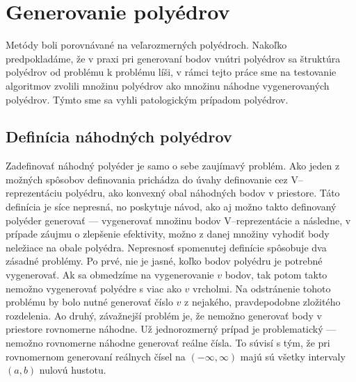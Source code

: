 \section{Generovanie polyédrov}
Metódy boli porovnávané na veľarozmerných polyédroch.
Nakoľko predpokladáme, že v praxi pri generovaní bodov vnútri polyédrov sa štruktúra polyédrov od problému k problému líši, v rámci tejto práce sme na testovanie algoritmov zvolili množinu polyédrov ako množinu náhodne vygenerovaných polyédrov.
Týmto sme sa vyhli patologickým prípadom polyédrov.

\subsection{Definícia náhodných polyédrov}
Zadefinovať náhodný polyéder je samo o sebe zaujímavý problém. Ako jeden z možných spôsobov definovania prichádza do úvahy definovanie cez V--reprezentáciu polyédru, ako konvexný obal náhodných bodov v priestore. Táto definícia je síce nepresná, no poskytuje návod, ako aj možno takto definovaný polyéder generovať --- vygenerovať množinu bodov V--reprezentácie a následne, v prípade záujmu o zlepšenie efektivity, možno z danej množiny vyhodiť body neležiace na obale polyédra. Nepresnosť spomenutej definície spôsobuje dva zásadné problémy.
Po prvé, nie je jasné, koľko bodov polyédru je potrebné vygenerovať. Ak sa obmedzíme na vygenerovanie $v$ bodov, tak potom takto nemožno vygenerovať polyédre s viac ako $v$ vrcholmi. Na odstránenie tohoto problému by bolo nutné generovať číslo $v$ z nejakého, pravdepodobne zložitého rozdelenia. 
Ao druhý, závažnejší problém je, že nemožno generovať body v priestore rovnomerne náhodne. Už jednorozmerný prípad je problematický --- nemožno rovnomerne náhodne generovať reálne čísla. To súvisí s tým, že pri rovnomernom generovaní reálnych čísel na $(-\infty, \infty)$ majú sú všetky intervaly $(a,b)$ nulovú hustotu.\\

